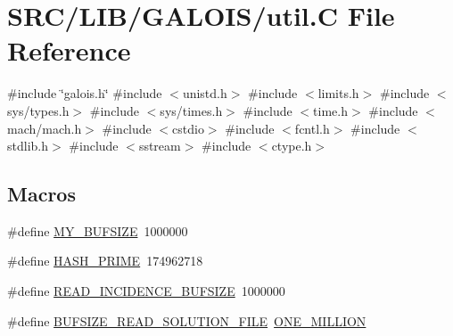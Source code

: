 \hypertarget{util_8_c}{}\section{S\+R\+C/\+L\+I\+B/\+G\+A\+L\+O\+I\+S/util.C File Reference}
\label{util_8_c}
{\ttfamily \#include \char`\"{}galois.\+h\char`\"{}}\newline
{\ttfamily \#include $<$unistd.\+h$>$}\newline
{\ttfamily \#include $<$limits.\+h$>$}\newline
{\ttfamily \#include $<$sys/types.\+h$>$}\newline
{\ttfamily \#include $<$sys/times.\+h$>$}\newline
{\ttfamily \#include $<$time.\+h$>$}\newline
{\ttfamily \#include $<$mach/mach.\+h$>$}\newline
{\ttfamily \#include $<$cstdio$>$}\newline
{\ttfamily \#include $<$fcntl.\+h$>$}\newline
{\ttfamily \#include $<$stdlib.\+h$>$}\newline
{\ttfamily \#include $<$sstream$>$}\newline
{\ttfamily \#include $<$ctype.\+h$>$}\newline
\subsection*{Macros}
\begin{DoxyCompactItemize}
\item 
\#define \mbox{\hyperlink{util_8_c_a6079b3b36c54787d2dca2de2fb2c96df}{M\+Y\+\_\+\+B\+U\+F\+S\+I\+ZE}}~1000000
\item 
\#define \mbox{\hyperlink{util_8_c_a3340643b9fb0a58333f04e75ff897e03}{H\+A\+S\+H\+\_\+\+P\+R\+I\+ME}}~174962718
\item 
\#define \mbox{\hyperlink{util_8_c_a6129d973eb062efb833f4e58ef412fae}{R\+E\+A\+D\+\_\+\+I\+N\+C\+I\+D\+E\+N\+C\+E\+\_\+\+B\+U\+F\+S\+I\+ZE}}~1000000
\item 
\#define \mbox{\hyperlink{util_8_c_a485440ee7c311b73148491eaaac84578}{B\+U\+F\+S\+I\+Z\+E\+\_\+\+R\+E\+A\+D\+\_\+\+S\+O\+L\+U\+T\+I\+O\+N\+\_\+\+F\+I\+LE}}~\mbox{\hyperlink{galois_8h_a6a146c1b2155b03eb2ffa3f4ba755034}{O\+N\+E\+\_\+\+M\+I\+L\+L\+I\+ON}}
\end{DoxyCompactItemize}
